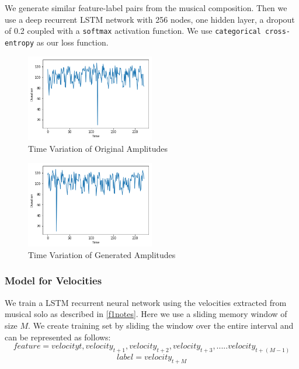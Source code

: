 \documentclass[conference]{IEEEtran}
\begin{document}
We generate similar feature-label pairs from the musical composition. Then we use a deep recurrent LSTM network with 256 nodes, one hidden layer, a dropout of 0.2 coupled with a \texttt{softmax} activation function. We use \texttt{categorical cross-entropy} as our loss function.\\

\begin{figure}[h]
\includegraphics[width=0.5\textwidth]{IEEEtran/amp_o.png}
\caption{Time Variation of Original Amplitudes}
\label{fig:figure3}
\end{figure}

\begin{figure}[h]
\includegraphics[width=0.5\textwidth]{IEEEtran/amp_g.png}
\caption{Time Variation of Generated Amplitudes}
\label{fig:figure4}
\end{figure}

\subsubsection{Model for Velocities}
We train a LSTM recurrent neural network using the velocities extracted from musical solo as described in \ref{f1notes}. Here we use a sliding memory window of size $M$. We create training set by sliding the window over the entire interval and can be represented as follows:
$$feature = {velocity{t},velocity_{t+1},velocity_{t+2},velocity_{t+3},.....velocity_{t+(M-1)}}$$
$$label = {velocity_{t+M}}$$
\end{document}
